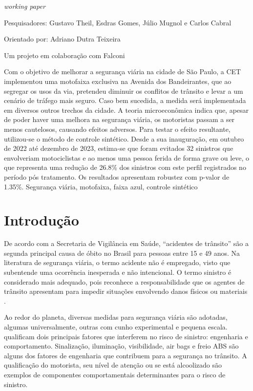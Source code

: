     {
    
      \noindent \textit{working paper}

      \noindent Pesquisadores: Gustavo Theil, Esdras Gomes, Júlio Mugnol e Carlos Cabral

      \noindent Orientado por: Adriano Dutra Teixeira

      \noindent Um projeto em colaboração com Falconi

    }
    {
        Com o objetivo de melhorar a segurança viária na cidade de São Paulo, a CET implementou uma motofaixa exclusiva na Avenida dos Bandeirantes, que ao segregar os usos da via, pretendeu diminuir os conflitos de trânsito e levar a um cenário de tráfego mais seguro. Caso bem sucedida, a medida será implementada em diversos outros trechos da cidade. A teoria microeconômica indica que, apesar de poder haver uma melhora na segurança viária, os motoristas passam a ser menos cautelosos, causando efeitos adversos. Para testar o efeito resultante, utilizou-se o método de controle sintético. Desde a sua inauguração, em outubro de 2022 até dezembro de 2023, estima-se que foram evitados 32 sinistros que envolveriam motociclistas e ao menos uma pessoa ferida de forma grave ou leve, o que representa uma redução de 26.8\% dos sinistros com este perfil registrados no período pós tratamento. Os resultados apresentam robustez com p-valor de 1.35\%.
    }
    {Segurança viária, motofaixa, faixa azul, controle sintético}

\section{Introdução}


De acordo com a Secretaria de Vigilância em Saúde, ``acidentes de trânsito'' são a segunda principal causa de óbito no Brasil para pessoas entre 15 e 49 anos. Na literatura de segurança viária, o termo acidente não é empregado, visto que subentende uma ocorrência inesperada e não intencional. O termo sinistro é considerado mais adequado, pois reconhece a responsabilidade que os agentes de trânsito apresentam para impedir situações envolvendo danos físicos ou materiais \cite{nbr10697}.

Ao redor do planeta, diversas medidas para segurança viária são adotadas, algumas universalmente, outras com cunho experimental e pequena escala. \textcite{wang2013effect} qualificam dois principais fatores que interferem no risco de sinistro: engenharia e comportamento. Sinalização, iluminação, visibilidade, air bags e freio ABS são alguns dos fatores de engenharia que contribuem para a segurança no trânsito. A qualificação do motorista, seu nível de atenção ou se está alcoolizado são exemplos de componentes comportamentais determinantes para o risco de sinistro.

